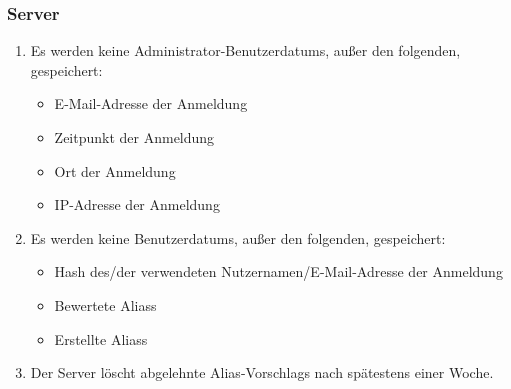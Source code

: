 \subsubsection*{Server}

\begin{samepage}
    \begin{enumerate}[label=\textbf{/NFD\arabic*0/}, align=left, start=5]
        \item Es werden keine \Gls{Administrator}-\Glspl{Benutzerdatum}, außer den folgenden, gespeichert:
            \begin{itemize}
                \item E-Mail-Adresse der Anmeldung
                \item Zeitpunkt der Anmeldung
                \item Ort der Anmeldung
                \item \Gls{IP-Adresse} der Anmeldung
            \end{itemize}
        \item Es werden keine \Glspl{Benutzerdatum}, außer den folgenden, gespeichert:
            \begin{itemize}
                \item \Gls{Hash} des/der verwendeten Nutzernamen/E-Mail-Adresse der Anmeldung
                \item Bewertete \Glspl{Alias} 
                \item Erstellte \Glspl{Alias} 
            \end{itemize}
        \item Der \Gls{Server} löscht abgelehnte \Glspl{Alias-Vorschlag} nach spätestens einer Woche.
    \end{enumerate}
\end{samepage}
